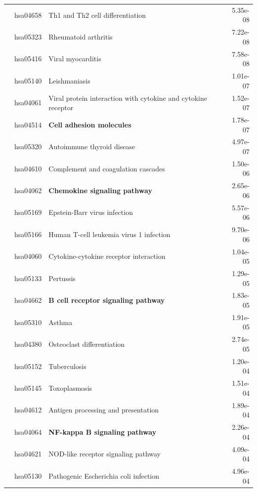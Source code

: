 \begin{longtable}{cllr}
 & hsa04658 & \textcolor{\clrnew}{Th1 and Th2 cell differentiation} & 5.35e-08 \\ 
 \rowcolor{\clrmatch}& hsa05323 & Rheumatoid arthritis & 7.22e-08 \\ 
 \rowcolor{\clrmatch}& hsa05416 & Viral myocarditis & 7.58e-08 \\ 
 \rowcolor{\clrmatch}& hsa05140 & Leishmaniasis & 1.01e-07 \\ 
 & hsa04061 & \textcolor{\clrnew}{Viral protein interaction with cytokine and cytokine receptor} & 1.52e-07 \\ 
 \rowcolor{\clrpath}& hsa04514 & \textbf{Cell adhesion molecules} & 1.78e-07 \\ 
 \rowcolor{\clrmatch}& hsa05320 & Autoimmune thyroid disease & 4.97e-07 \\ 
 & hsa04610 & \textcolor{\clrnew}{Complement and coagulation cascades} & 1.50e-06 \\ 
 \rowcolor{\clrpath}& hsa04062 & \textbf{Chemokine signaling pathway} & 2.65e-06 \\ 
 & hsa05169 & \textcolor{\clrnew}{Epstein-Barr virus infection} & 5.57e-06 \\ 
 \rowcolor{\clrmatch}& hsa05166 & Human T-cell leukemia virus 1 infection & 9.70e-06 \\ 
 \rowcolor{\clrmatch}& hsa04060 & Cytokine-cytokine receptor interaction & 1.04e-05 \\ 
 & hsa05133 & \textcolor{\clrnew}{Pertussis} & 1.29e-05 \\ 
 \rowcolor{\clrpath}& hsa04662 & \textbf{B cell receptor signaling pathway} & 1.83e-05 \\ 
 \rowcolor{\clrmatch}& hsa05310 & Asthma & 1.91e-05 \\ 
 & hsa04380 & \textcolor{\clrnew}{Osteoclast differentiation} & 2.74e-05 \\ 
 \rowcolor{\clrmatch}& hsa05152 & Tuberculosis & 1.20e-04 \\ 
 \rowcolor{\clrmatch}& hsa05145 & Toxoplasmosis & 1.51e-04 \\ 
 \rowcolor{\clrmatch}& hsa04612 & Antigen processing and presentation & 1.89e-04 \\ 
 \rowcolor{\clrpath}& hsa04064 & \textbf{NF-kappa B signaling pathway}& 2.26e-04 \\ 
 & hsa04621 & \textcolor{\clrnew}{NOD-like receptor signaling pathway} & 4.09e-04 \\ 
 & hsa05130 & \textcolor{\clrnew}{Pathogenic Escherichia coli infection} & 4.96e-04 \\ 

\end{longtable}
